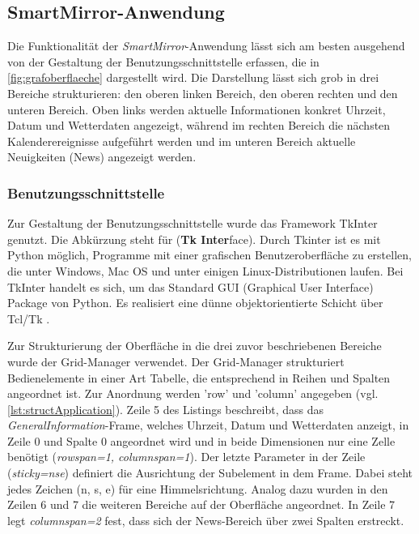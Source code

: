 \subsection{SmartMirror-Anwendung}
\label{smartMirror}
Die Funktionalität der \textit{SmartMirror}-Anwendung lässt sich am besten ausgehend von der Gestaltung der Benutzungsschnittstelle erfassen, die in \autoref{fig:grafoberflaeche} dargestellt wird. Die Darstellung lässt sich grob in drei Bereiche strukturieren: den oberen linken Bereich, den oberen rechten und den unteren Bereich. Oben links werden aktuelle Informationen konkret Uhrzeit, Datum und Wetterdaten angezeigt, während im rechten Bereich die nächsten Kalenderereignisse aufgeführt werden und im unteren Bereich aktuelle Neuigkeiten (News) angezeigt werden. 

\subsubsection*{Benutzungsschnittstelle}

Zur Gestaltung der Benutzungsschnittstelle wurde das Framework TkInter genutzt. Die Abkürzung steht für (\textbf{Tk Inter}face).  Durch Tkinter ist es mit Python möglich, Programme mit einer grafischen Benutzeroberfläche zu erstellen, die unter Windows, Mac OS und unter einigen Linux-Distributionen laufen. Bei TkInter handelt es sich, um das Standard GUI (Graphical User Interface) Package von Python. Es realisiert eine dünne objektorientierte Schicht über Tcl/Tk \cite{scholl2014tcl}. 

Zur Strukturierung der Oberfläche in die drei zuvor beschriebenen Bereiche wurde der Grid-Manager verwendet. Der Grid-Manager strukturiert Bedienelemente in einer Art Tabelle, die entsprechend in Reihen und Spalten angeordnet ist. Zur Anordnung werden 'row' und 'column' angegeben (vgl. \autoref{lst:structApplication}). Zeile 5 des Listings beschreibt, dass das \textit{GeneralInformation}-Frame, welches Uhrzeit, Datum und Wetterdaten anzeigt, in Zeile 0 und Spalte 0 angeordnet wird und in beide Dimensionen nur eine Zelle benötigt (\textit{rowspan=1, columnspan=1}). Der letzte Parameter in der Zeile (\textit{sticky=\grqq nse\grqq}) definiert die Ausrichtung der Subelement in dem Frame. Dabei steht jedes Zeichen (n, s, e) für eine Himmelsrichtung. Analog dazu wurden in den Zeilen 6 und 7 die weiteren Bereiche auf der Oberfläche angeordnet. In Zeile 7 legt \textit{\textit{columnspan=2}} fest, dass sich der News-Bereich über zwei Spalten erstreckt.

\begin{minipage}{\textwidth}
	
\end{minipage}

